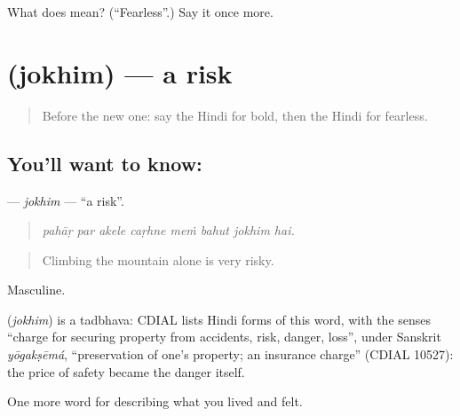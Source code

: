\begin{tcolorbox}[breakable,colback=teal!4,colframe=teal!35!black,title={Before you move on}]
What does  mean? (\textquotedblleft{}Fearless\textquotedblright{}.) Say it once more.
\end{tcolorbox}
\section[\texorpdfstring{\hi{जोखिम} (jokhim)}{जोखिम (jokhim)}]{ (jokhim) — a risk}

\label{lesson:HI-C470-jokhim}



\begin{quote}
Before the new one: say the Hindi for bold, then the Hindi for fearless.
\end{quote}

\subsection*{You'll want to know: }
\textbf{} — \emph{jokhim} — \textquotedblleft{}a risk\textquotedblright{}.

\begin{quote}
       
\end{quote}

\begin{quote}
\emph{pahāṛ par akele caṛhne meṁ bahut jokhim hai.}
\end{quote}

\begin{quote}
Climbing the mountain alone is very risky.
\end{quote}

Masculine.

\begin{cousinweb}
\textbf{} (\emph{jokhim}) is a tadbhava: CDIAL lists Hindi forms of this word, with the senses \textquotedblleft{}charge for securing property from accidents, risk, danger, loss\textquotedblright{}, under Sanskrit \emph{yōgakṣēmá}, \textquotedblleft{}preservation of one's property; an insurance charge\textquotedblright{} (CDIAL 10527): the price of safety became the danger itself.
\end{cousinweb}

\begin{grammarlens}[title={What you've built}]
One more word for describing what you lived and felt.
\end{grammarlens}

